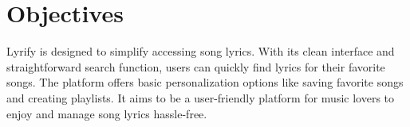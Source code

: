 \section{Objectives}


Lyrify is designed to simplify accessing song lyrics. With its clean interface and straightforward search function, users can quickly find lyrics for their favorite songs. The platform offers basic personalization options like saving favorite songs and creating playlists. It aims to be a user-friendly platform for music lovers to enjoy and manage song lyrics hassle-free. 